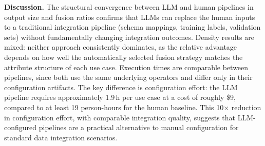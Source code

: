 \textbf{Discussion.}\label{sec:e2e_discussion} The structural convergence between LLM and human pipelines in output size and fusion ratios confirms that LLMs can replace the human inputs to a traditional integration pipeline (schema mappings, training labels, validation sets) without fundamentally changing integration outcomes. Density results are mixed: neither approach consistently dominates, as the relative advantage depends on how well the automatically selected fusion strategy matches the attribute structure of each use case. Execution times are comparable between pipelines, since both use the same underlying operators and differ only in their configuration artifacts. The key difference is configuration effort: the LLM pipeline requires approximately 1.9\,h per use case at a cost of roughly \$9, compared to at least 19 person-hours for the human baseline. This 10$\times$ reduction in configuration effort, with comparable integration quality, suggests that LLM-configured pipelines are a practical alternative to manual configuration for standard data integration scenarios.

